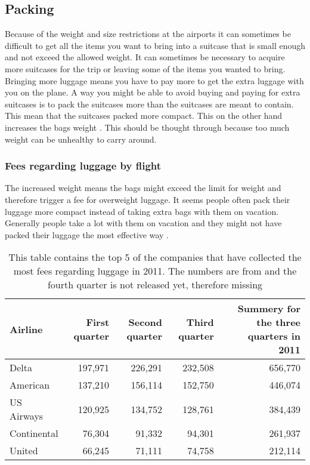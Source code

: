 \subsection{Packing}

Because of the weight and size restrictions at the airports it can sometimes be difficult to get all the items you want to bring into a suitcase that is small enough and not exceed the allowed weight. It can sometimes be necessary to acquire more suitcases for the trip or leaving some of the items you wanted to bring. 
Bringing more luggage means you have to pay more to get the extra luggage with you on the plane. A way you might be able to avoid buying and paying for extra suitcases is to pack the suitcases more than the suitcases are meant to contain. This mean that the suitcases packed more compact. This on the other hand increases the bags weight \citep{altombag}. This should be thought through because too much weight can be unhealthy to carry around.

\subsubsection{Fees regarding luggage by flight}
The increased weight means the bags might exceed the limit for weight and therefore trigger a fee for overweight luggage.
It seems people often pack their luggage more compact instead of taking extra bags with them on vacation. Generally people take a lot with them on vacation and they might not have packed their luggage the most effective way \citep{airstat}.

\begin{table}[H]
\begin{tabular}{| l | r | r | r | r |}
\hline
Airline &  First quarter & Second quarter & Third quarter & Summery for the three quarters in 2011 \\ \hline
Delta & 197,971 & 226,291 & 232,508 & 656,770 \\ \hline
American & 137,210 & 156,114 & 152,750 & 446,074 \\ \hline
US Airways & 120,925 & 134,752 & 128,761 & 384,439 \\ \hline
Continental & 76,304 & 91,332 & 94,301 & 261,937\\ \hline
United & 66,245 & 71,111 & 74,758 & 212,114 \\ \hline
\end{tabular}
\caption{This table contains the top 5 of the companies that have collected the most fees regarding luggage in 2011. The numbers are from \citep{airstat} and the fourth quarter is not released yet, therefore missing}
\label{tab:airlinefees}
\end{table}

